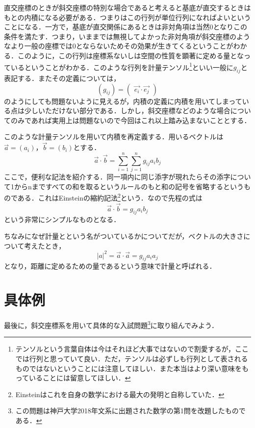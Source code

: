 \documentclass[dvipdfmx,a4]{jsarticle}
\begin{document}
直交座標のときが斜交座標の特別な場合であると考えると基底が直交するときはもとの内積になる必要がある．つまりはこの行列が単位行列になればよいということになる．一方で，基底が直交関係にあるときは非対角項は当然0となりこの条件を満たす．つまり，いままでは無視してよかった非対角項が斜交座標のようなより一般の座標では0とならないためその効果が生きてくるということがわかる．このように，この行列は座標系ないしは空間の性質を顕著に定める量となっているということがわかる．このような行列を計量テンソル\footnote{テンソルという言葉自体は今はそれほど大事ではないので割愛するが，ここでは行列と思っていて良い．ただ，テンソルは必ずしも行列として表されるものではないということには注意してほしい．また本当はより深い意味をもっていることには留意してほしい．}といい一般に\(g_{ij}\)と表記する．またその定義については，
\begin{equation*}
  (g_{ij}) = \begin{pmatrix}
    \vec{e_i} \cdot \vec{e_j} 
  \end{pmatrix}
\end{equation*}
のようにしても問題ないように見えるが，内積の定義に内積を用いてしまっている点は少しいただけない部分である．しかし，斜交座標などのような場合についてのみであれば実用上は問題ないので今回はこれ以上踏み込まないこととする．

このような計量テンソルを用いて内積を再定義する．用いるベクトルは\(\vec{a} = (a_i)\)，\(\vec{b} = (b_i)\)とする．
\begin{equation*}
  \vec{a}\cdot \vec{b}= 
  \sum ^n _{i=1} \sum ^n _{j=1} g_{ij} a_{i} b_{j}
\end{equation*}
ここで，便利な記法を紹介する．同一項内に同じ添字が現れたらその添字について1からnまですべての和を取るというルールのもと和の記号を省略するというものである．これはEinsteinの縮約記法\footnote{Einsteinはこれを自身の数学における最大の発明と自称していた．}という．なので先程の式は
\begin{equation*}
  \vec{a}\cdot \vec{b}=  g_{ij} a_{i} b_{j}
\end{equation*}
という非常にシンプルなものとなる．

ちなみになぜ計量とという名がついているかについてだが，ベクトルの大きさについて考えたとき，
\begin{equation*}
  |a|^2 = \vec{a}\cdot \vec{a}=  g_{ij} a_{i} a_{j}
\end{equation*}
となり，距離に定めるための量であるという意味で計量と呼ばれる．

\section{具体例}
最後に，斜交座標系を用いて具体的な入試問題\footnote{この問題は神戸大学2018年文系に出題された数学の第1問を改題したものである．}に取り組んでみよう．
\end{document}
